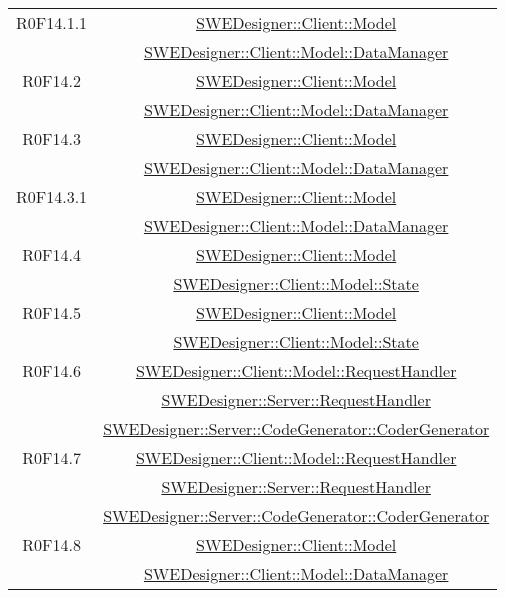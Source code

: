 \documentclass[../SpecificaTecnica.tex]{subfiles}
\begin{document}
\begin{longtable}{|c|c|}
		R0F14.1.1 & \hyperlink{SWEDesigner::Client::Model}{SWEDesigner::Client::Model} \\& \hyperlink{SWEDesigner::Client::Model::DataManager}{SWEDesigner::Client::Model::DataManager}\\\hline
		R0F14.2 & \hyperlink{SWEDesigner::Client::Model}{SWEDesigner::Client::Model} \\& \hyperlink{SWEDesigner::Client::Model::DataManager}{SWEDesigner::Client::Model::DataManager}\\\hline
		R0F14.3 & \hyperlink{SWEDesigner::Client::Model}{SWEDesigner::Client::Model} \\& \hyperlink{SWEDesigner::Client::Model::DataManager}{SWEDesigner::Client::Model::DataManager}\\\hline
		R0F14.3.1 & \hyperlink{SWEDesigner::Client::Model}{SWEDesigner::Client::Model} \\& \hyperlink{SWEDesigner::Client::Model::DataManager}{SWEDesigner::Client::Model::DataManager}\\\hline
		R0F14.4 & \hyperlink{SWEDesigner::Client::Model}{SWEDesigner::Client::Model} \\& \hyperlink{SWEDesigner::Client::Model::State}{SWEDesigner::Client::Model::State}\\\hline
		R0F14.5 & \hyperlink{SWEDesigner::Client::Model}{SWEDesigner::Client::Model} \\& \hyperlink{SWEDesigner::Client::Model::State}{SWEDesigner::Client::Model::State}\\\hline
		R0F14.6 & \hyperlink{SWEDesigner::Client::Model::RequestHandler}{SWEDesigner::Client::Model::RequestHandler} \\& \hyperlink{SWEDesigner::Server::RequestHandler}{SWEDesigner::Server::RequestHandler} \\& \hyperlink{SWEDesigner::Server::CodeGenerator::CoderGenerator}{SWEDesigner::Server::CodeGenerator::CoderGenerator} \\\hline
		R0F14.7 & \hyperlink{SWEDesigner::Client::Model::RequestHandler}{SWEDesigner::Client::Model::RequestHandler} \\& \hyperlink{SWEDesigner::Server::RequestHandler}{SWEDesigner::Server::RequestHandler} \\& \hyperlink{SWEDesigner::Server::CodeGenerator::CoderGenerator}{SWEDesigner::Server::CodeGenerator::CoderGenerator} \\\hline
		R0F14.8 & \hyperlink{SWEDesigner::Client::Model}{SWEDesigner::Client::Model}\\& \hyperlink{SWEDesigner::Client::Model::DataManager}{SWEDesigner::Client::Model::DataManager}\\\hline

\end{longtable}
\end{document}
